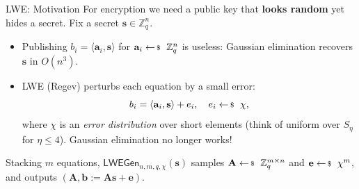 \documentclass{zkdl-presentation-template}
\begin{document}
    \begin{frame}{LWE: Motivation}
        For encryption we need a public key that \textbf{looks random} yet hides a secret. Fix a secret $\mathbf{s} \in \mathbb{Z}_q^n$.
        \pause

        \begin{itemize}
            \item Publishing $b_i = \langle \mathbf{a}_i, \mathbf{s} \rangle$ for $\mathbf{a}_i \leftarrowS \mathbb{Z}_q^n$ is useless: Gaussian elimination recovers $\mathbf{s}$ in $O(n^3)$.\pause
            \item LWE (Regev) perturbs each equation by a small error:
            \begin{equation*}
                b_i = \langle \mathbf{a}_i, \mathbf{s} \rangle + e_i, \quad e_i \leftarrowS \chi,
            \end{equation*}
            where $\chi$ is an \emph{error distribution} over short elements (think of uniform over $S_{\eta}$ for $\eta \leq 4$). Gaussian elimination no longer works!
        \end{itemize}
        \pause

        \begin{definition}
            Stacking $m$ equations, $\mathsf{LWEGen}_{n,m,q,\chi}(\mathbf{s})$ samples $\mathbf{A} \leftarrowS \mathbb{Z}_q^{m \times n}$ and $\mathbf{e} \leftarrowS \chi^m$, and outputs $(\mathbf{A}, \mathbf{b} := \mathbf{A}\mathbf{s}+\mathbf{e})$.
        \end{definition}
    \end{frame}
\end{document}
